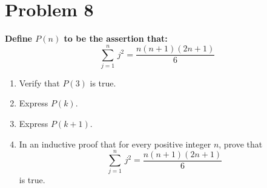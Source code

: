 \documentclass{amsart}
\theoremstyle{definition}
\theoremstyle{remark}
\numberwithin{equation}{section}
\begin{document}

\section*{Problem 8}
\textbf{Define $P(n)$ to be the assertion that:}
\[\displaystyle \sum_{j=1}^{n}\, j^2 = \frac{n(n+1)(2n+1)}{6}\]
\begin{enumerate}[label=(\alph*)]
    \item Verify that $P(3)$ is true.
    \item Express $P(k)$.
    \item Express $P(k+1)$.
    \item In an inductive proof that for every positive integer $n$, prove that \[\displaystyle \sum_{j=1}^{n}\, j^2 = \frac{n(n+1)(2n+1)}{6}\] is true.
\end{enumerate}
\end{document}
